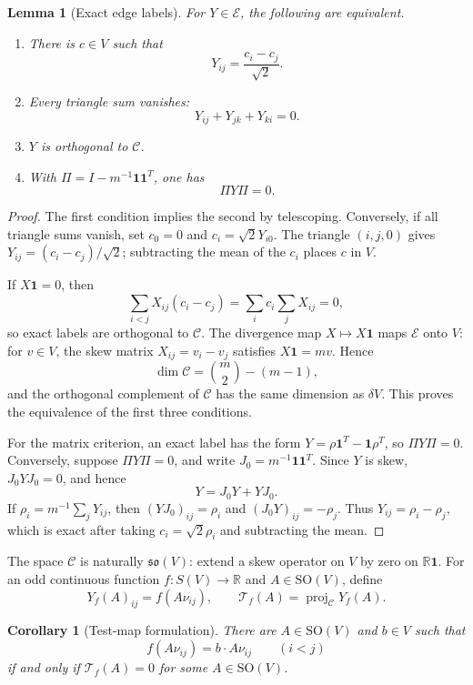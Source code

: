 \documentclass[11pt,reqno]{amsart}
\newtheorem{lemma}[theorem]{Lemma}
\newtheorem{corollary}[theorem]{Corollary}
\theoremstyle{definition}
\theoremstyle{remark}
\newcommand{\R}{\mathbb R}
\newcommand{\one}{\mathbf 1}
\newcommand{\SO}{\mathrm{SO}}
\newcommand{\proj}{\operatorname{proj}}
\newcommand{\cE}{\mathcal E}
\newcommand{\cC}{\mathcal C}
\newcommand{\cT}{\mathcal T}
\begin{document}
\begin{lemma}[Exact edge labels]\label{lem:exact-labels}
For $Y\in\cE$, the following are equivalent.
\begin{enumerate}
\item There is $c\in V$ such that
\[
Y_{ij}=\frac{c_i-c_j}{\sqrt2}.
\]
\item Every triangle sum vanishes:
\[
Y_{ij}+Y_{jk}+Y_{ki}=0.
\]
\item $Y$ is orthogonal to $\cC$.
\item With $\Pi=I-m^{-1}\one\one^T$, one has
\[
\Pi Y\Pi=0.
\]
\end{enumerate}
\end{lemma}

\begin{proof}
The first condition implies the second by telescoping.  Conversely, if all
triangle sums vanish, set $c_0=0$ and $c_i=\sqrt2Y_{i0}$.  The triangle
$(i,j,0)$ gives $Y_{ij}=(c_i-c_j)/\sqrt2$; subtracting the mean of the $c_i$
places $c$ in $V$.

If $X\one=0$, then
\[
\sum_{i<j}X_{ij}(c_i-c_j)=\sum_i c_i\sum_jX_{ij}=0,
\]
so exact labels are orthogonal to $\cC$.  The divergence map
$X\mapsto X\one$ maps $\cE$ onto $V$: for $v\in V$, the skew matrix
$X_{ij}=v_i-v_j$ satisfies $X\one=mv$.  Hence
\[
\dim\cC=\binom m2-(m-1),
\]
and the orthogonal complement of $\cC$ has the same dimension as $\delta V$.
This proves the equivalence of the first three conditions.

For the matrix criterion, an exact label has the form
$Y=\rho\one^T-\one\rho^T$, so $\Pi Y\Pi=0$.  Conversely, suppose
$\Pi Y\Pi=0$, and write $J_0=m^{-1}\one\one^T$.  Since $Y$ is skew,
$J_0YJ_0=0$, and hence
\[
Y=J_0Y+YJ_0.
\]
If $\rho_i=m^{-1}\sum_jY_{ij}$, then
$(YJ_0)_{ij}=\rho_i$ and $(J_0Y)_{ij}=-\rho_j$.  Thus
$Y_{ij}=\rho_i-\rho_j$, which is exact after taking
$c_i=\sqrt2\rho_i$ and subtracting the mean.
\end{proof}

The space $\cC$ is naturally $\mathfrak{so}(V)$: extend a skew operator on
$V$ by zero on $\R\one$.  For an odd continuous function
$f\colon S(V)\to\R$ and $A\in\SO(V)$, define
\begin{equation}\label{eq:test-map}
Y_f(A)_{ij}=f(A\nu_{ij}),\qquad
\cT_f(A)=\proj_{\cC}Y_f(A).
\end{equation}

\begin{corollary}[Test-map formulation]\label{cor:test-map}
There are $A\in\SO(V)$ and $b\in V$ such that
\[
f(A\nu_{ij})=b\cdot A\nu_{ij}\qquad(i<j)
\]
if and only if $\cT_f(A)=0$ for some $A\in\SO(V)$.
\end{corollary}
\end{document}
